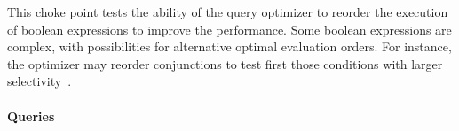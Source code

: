 
This choke point tests the ability of the query optimizer to reorder the
execution of boolean expressions to improve the performance. Some boolean
expressions are complex, with possibilities for alternative optimal evaluation
orders. For instance, the optimizer may reorder conjunctions to test first those
conditions with larger selectivity~\cite{DBLP:conf/vldb/Moerkotte98}.


\paragraph{Queries}
{\raggedright
}